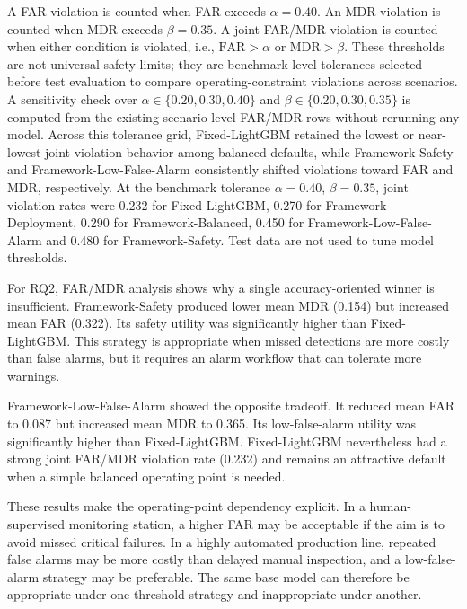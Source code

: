 A FAR violation is counted when FAR exceeds $\alpha=0.40$. An MDR violation is counted when MDR exceeds $\beta=0.35$. A joint FAR/MDR violation is counted when either condition is violated, i.e., $\mathrm{FAR}>\alpha$ or $\mathrm{MDR}>\beta$. These thresholds are not universal safety limits; they are benchmark-level tolerances selected before test evaluation to compare operating-constraint violations across scenarios. A sensitivity check over $\alpha\in\{0.20,0.30,0.40\}$ and $\beta\in\{0.20,0.30,0.35\}$ is computed from the existing scenario-level FAR/MDR rows without rerunning any model. Across this tolerance grid, Fixed-\allowbreak LightGBM retained the lowest or near-lowest joint-violation behavior among balanced defaults, while Framework-\allowbreak Safety and Framework-\allowbreak Low-\allowbreak False-\allowbreak Alarm consistently shifted violations toward FAR and MDR, respectively. At the benchmark tolerance $\alpha=0.40$, $\beta=0.35$, joint violation rates were 0.232 for Fixed-\allowbreak LightGBM, 0.270 for Framework-\allowbreak Deployment, 0.290 for Framework-\allowbreak Balanced, 0.450 for Framework-\allowbreak Low-\allowbreak False-\allowbreak Alarm and 0.480 for Framework-\allowbreak Safety. Test data are not used to tune model thresholds.

For RQ2, FAR/MDR analysis shows why a single accuracy-oriented winner is insufficient. Framework-\allowbreak Safety produced lower mean MDR (0.154) but increased mean FAR (0.322). Its safety utility was significantly higher than Fixed-\allowbreak LightGBM. This strategy is appropriate when missed detections are more costly than false alarms, but it requires an alarm workflow that can tolerate more warnings.



Framework-\allowbreak Low-\allowbreak False-\allowbreak Alarm showed the opposite tradeoff. It reduced mean FAR to 0.087 but increased mean MDR to 0.365. Its low-false-alarm utility was significantly higher than Fixed-\allowbreak LightGBM. Fixed-\allowbreak LightGBM nevertheless had a strong joint FAR/MDR violation rate (0.232) and remains an attractive default when a simple balanced operating point is needed.

These results make the operating-point dependency explicit. In a human-supervised monitoring station, a higher FAR may be acceptable if the aim is to avoid missed critical failures. In a highly automated production line, repeated false alarms may be more costly than delayed manual inspection, and a low-false-alarm strategy may be preferable. The same base model can therefore be appropriate under one threshold strategy and inappropriate under another.



